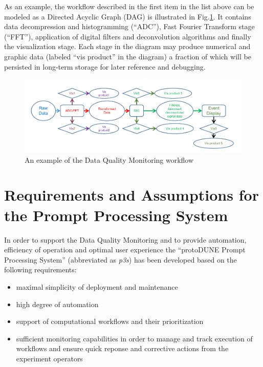\documentclass{PoS}
\newcommand{\pd}{protoDUNE\xspace}
\begin{document}
\noindent As an example, the workflow described in the first item in the list above can be modeled as a Directed Acyclic Graph (DAG)
is illustrated in Fig.\ref{fig:dag1}. It contains data decompression and histogramming (``ADC''), Fast Fourier Transform stage (``FFT''),
application of digital filters and deconvolution algorithms and finally the visualization stage. Each stage in the diagram may produce
numerical and graphic data (labeled ``vis product'' in the diagram) a fraction of which will be persisted in long-term storage for
later reference and debugging.

\begin{figure}[tb]
\centering\includegraphics[width=1.0\textwidth]{dag1.pdf}
\caption{\label{fig:dag1}An example of the Data Quality Monitoring workflow}
\end{figure}

\section{Requirements and Assumptions for the Prompt Processing System}
In order to support the Data Quality Monitoring and 
to provide automation, efficiency of operation and optimal user experience
the ``\pd Prompt Processing System'' (abbreviated as \textit{p3s}) has been developed
based on the following requirements:
\begin{itemize}
\item maximal simplicity of deployment and maintenance

\item high degree of automation

\item support of computational workflows and their prioritization

\item sufficient monitoring capabilities in order to manage and track execution of workflows and ensure quick
reponse and corrective actions from the experiment operators
\end{itemize}
\end{document}

